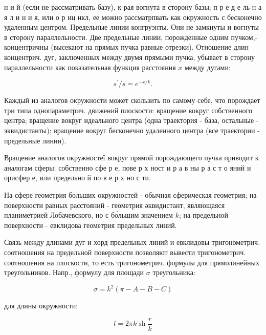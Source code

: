 \documentclass[10pt]{article}
\begin{document}
н и й (если не рассматривать базу), к-рая вогнута в сторону базы; п р е д е ль н а я л и н и я, или о р иц икл, ее можно рассматрпвать как окружность с бесконечно удаленным центром. Предельные линии конгруэнты. Они не замкнуты и вогнуты в сторону параллельности. Две предельные линии, порожденные одним пучком,- концентричны (высекают на прямых пучка равные отрезки). Отношение длин концентрич. дуг, заключенных между двумя прямыми пучка, убывает в сторону параллельности как показательная функция расстояния $x$ между дугами:



\[

s^{\prime} / s=e^{-x / k} .

\]



Каждый из аналогов окружности может скользить по самому себе, что порождает три типа однопараметрич. движений плоскости: вращение вокруг собственного центра; вращение вокруг идеального центра (одна траектория - база, остальные - эквидистанты); вращение вокруг бесконечно удаленного центра (все траектории - предельные линии).



Вращение аналогов окружностеї вокруг прямой порождающего пучка приводит к аналогам сферы: собственно сфе р е, пове р х ност и р а в ны р а с т о яний и орисфер е, или предельно й по в е р х но с ти.



На сфере геометрия больших окружностей - обычная сферическая геометрия; на поверхности равных расстояний - геометрия әквидистант, являющаяся планиметрией Лобачевского, но с бо́льшим значением $k$; на предельной поверхности - евклидова геометрия предельных линий.



Связь между длинами дуг и хорд предельных линий и евклидовы тригонометрич. соотношения на предельной поверхности позволяют вывести тригонометрич. соотношения на плоскости, то есть тригонометрич. формулы для прямолинейных треугольников. Напр., формулу для площади $\sigma$ треугольника:



\[

\sigma=k^{2}(\pi-A-B-C)

\]



для длины окружности:



\[

l=2 \pi k \operatorname{sh} \frac{r}{k}

\]
\end{document}
